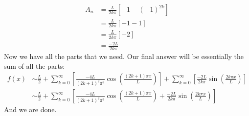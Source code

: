 \documentclass{article}
\begin{document}
\begin{align*}
A_{n} &= \frac{L}{2k\pi}\left[-1-(-1)^{2k}\right]\\
&= \frac{L}{2k\pi}\left[-1 - 1\right]\\
&= \frac{L}{2k\pi}\left[-2\right]\\
&= \frac{-2L}{2k\pi}
\end{align*}
\noindent Now we have all the parts that we need. Our final answer will be essentially the sum of all the parts:
\begin{align*}
f(x)&\sim \frac{L}{2} + \sum_{k = 0}^{\infty}\left[\frac{-4L}{(2k+1)^{2}\pi^{2}}\cos{\left(\frac{(2k + 1)\pi x}{L}\right)} \right] + \sum_{k = 0}^{\infty}\left[\frac{-2L}{2k\pi}\sin{\left(\frac{2k\pi x}{L}\right)} \right]\\
&\sim \frac{L}{2} + \sum_{k = 0}^{\infty}\left[\frac{-4L}{(2k+1)^{2}\pi^{2}}\cos{\left(\frac{(2k + 1)\pi x}{L}\right)} + \frac{-2L}{2k\pi}\sin{\left(\frac{2k\pi x}{L}\right)} \right]
\end{align*}
\noindent And we are done.\\
\end{document}
